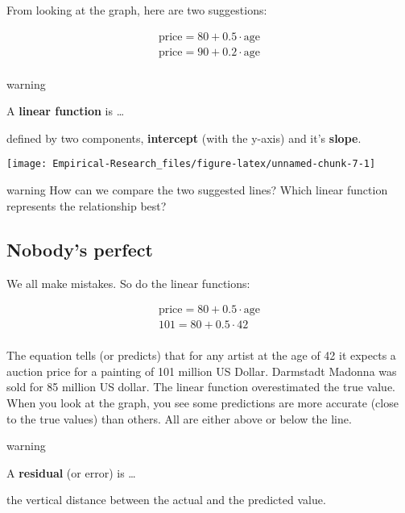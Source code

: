 \documentclass[
]{book}
\begin{document}
From looking at the graph, here are two suggestions:

\[ \begin{align}
\text{price} = 80 + 0.5 \cdot \text{age} \tag{Suggestion 1} \\
\text{price} = 90 + 0.2 \cdot \text{age} \tag{Suggestion 2} \\
\end{align}\]

\begin{infobox}warning

A \textbf{linear function} is \ldots{}

defined by two components, \textbf{intercept} (with the y-axis) and it's \textbf{slope}.

\end{infobox}

\begin{center}\texttt{[image: Empirical-Research\_files/figure-latex/unnamed-chunk-7-1]} \end{center}

\begin{infobox}warning
How can we compare the two suggested lines? Which linear function represents the relationship best?

\end{infobox}

\hypertarget{nobodys-perfect}{%
\subsection{Nobody's perfect}\label{nobodys-perfect}}

We all make mistakes. So do the linear functions:

\[ \begin{align}
\text{price} = 80 + 0.5 \cdot \text{age} \tag{Suggestion 1} \\
101 = 80 + 0.5 \cdot 42 \tag{Calculation for Hohlbein} \\
\end{align}\]

The equation tells (or predicts) that for any artist at the age of 42 it expects a auction price for a painting of 101 million US Dollar. Darmstadt Madonna was sold for 85 million US dollar. The linear function overestimated the true value. When you look at the graph, you see some predictions are more accurate (close to the true values) than others. All are either above or below the line.

\begin{infobox}warning

A \textbf{residual} (or error) is \ldots{}

the vertical distance between the actual and the predicted value.

\end{infobox}
\end{document}
